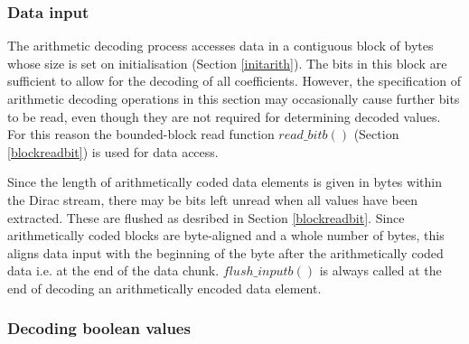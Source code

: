 \subsubsection{Data input}
\label{inputarith}

The arithmetic decoding process accesses data in a contiguous block of bytes
whose size is set on initialisation (Section \ref{initarith}). The bits in this
block are sufficient to allow for the
decoding of all coefficients. However, the specification of arithmetic
decoding operations in this section may occasionally cause further bits to be read,
even though they are not required for determining decoded values. For this
reason the bounded-block read function $read\_bitb()$ (Section \ref{blockreadbit}) is 
used for data access.

Since the length of arithmetically coded data elements is given in bytes within the Dirac
stream, there may be bits left unread when all values have been extracted. These
are flushed as desribed in Section \ref{blockreadbit}. Since arithmetically coded blocks
are byte-aligned and a whole number of bytes, this aligns data input with the beginning of the byte 
after the arithmetically coded data i.e. at the end of the
data chunk. $flush\_inputb()$ is always called at the end of decoding an arithmetically encoded
data element.

\begin{comment}
\begin{informative}
The Dirac arithmetic decoding engine uses 16 bit words, and so if all coefficients are
coded no more than 16 additional bits should be read beyond the end of the block. Hence it 
would seem sufficient to read in the entire block of data and pad the end with two bytes of value 0xFF,
to avoid a branch condition on inputting data
However, an arithmetically encoded block may end with a string of 1s, which an encoder could
conceivably strip out to save bits, in the knowledge that $read\_bitb()$ will re-insert them. Terminating
strings of 1s can occur (but not exclusively) in coding many zero wavelet subband coefficients at the end
of a subband. So a larger number of pad bytes may be required in practice.
\end{informative}
\end{comment}

\subsubsection{Decoding boolean values}
\label{arithreadbool}

